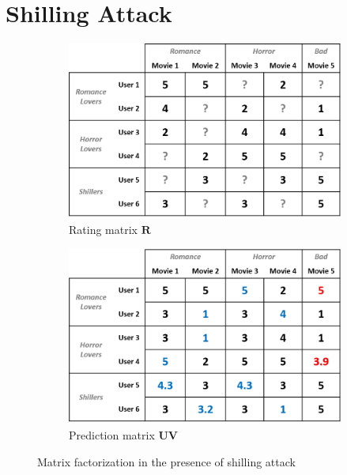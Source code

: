 \documentclass[master,english,final]{kaist-ucs}
\begin{document}
\section{Shilling Attack}
\begin{figure}[b]
    \centering
    \begin{subfigure}[b]{0.45\textwidth}
        \centering
        \includegraphics[width=\textwidth]{figure/mf_after_rating}
        \caption{Rating matrix $\bm{R}$}
        \label{mf_after_rating}
    \end{subfigure}
    \begin{subfigure}[b]{0.45\textwidth}
        \centering
        \includegraphics[width=\textwidth]{figure/mf_after_prediction}
        \caption{Prediction matrix $\bm{UV}$}
        \label{mf_after_prediction}
    \end{subfigure}
    \caption{Matrix factorization in the presence of shilling attack}
    \label{mf_attacked}
\end{figure}
\end{document}
